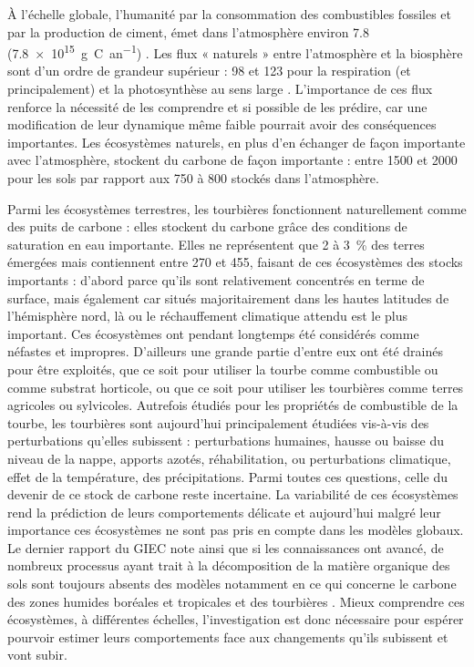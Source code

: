 À l'échelle globale, l'humanité par la consommation des combustibles fossiles et par la production de ciment, émet dans l'atmosphère environ \SI{7.8}{\pgca} (\SI{7.8e15}{\gram C an^{-1}}) \citep{Ciais2014}.
Les flux « naturels » entre l'atmosphère et la biosphère sont d'un ordre de grandeur supérieur : \num{98} et \SI{123}{\pgca} pour la respiration (\coo et \chh principalement) et la photosynthèse au sens large \citep{Bond-Lamberty2010,Beer2010}. L'importance de ces flux renforce la nécessité de les comprendre et si possible de les prédire, car une modification de leur dynamique même faible pourrait avoir des conséquences importantes.
Les écosystèmes naturels, en plus d'en échanger de façon importante avec l'atmosphère, stockent du carbone de façon importante : entre \num{1500} et \SI{2000}{\pgc} pour les sols par rapport aux \num{750} à \SI{800}{\pgc} stockés dans l'atmosphère.

Parmi les écosystèmes terrestres, les tourbières fonctionnent naturellement comme des puits de carbone : elles stockent du carbone grâce des conditions de saturation en eau importante.
Elles ne représentent que \num{2} à \SI{3}{\percent} des terres émergées mais contiennent entre \num{270} et \SI{455}{\pgc}, faisant de ces écosystèmes des stocks importants \citep{gorham1991,turunen2002} :
d'abord parce qu'ils sont relativement concentrés en terme de surface, mais également car situés majoritairement dans les hautes latitudes de l'hémisphère nord, là ou le réchauffement climatique attendu est le plus important.
Ces écosystèmes ont pendant longtemps été considérés comme néfastes et impropres.
D'ailleurs une grande partie d'entre eux ont été drainés pour être exploités, que ce soit pour utiliser la tourbe comme combustible ou comme substrat horticole, ou que ce soit pour utiliser les tourbières comme terres agricoles ou sylvicoles.
Autrefois étudiés pour les propriétés de combustible de la tourbe, les tourbières sont aujourd'hui principalement étudiées vis-à-vis des perturbations qu'elles subissent : perturbations humaines, hausse ou baisse du niveau de la nappe, apports azotés, réhabilitation, ou perturbations climatique, effet de la température, des précipitations.
Parmi toutes ces questions, celle du devenir de ce stock de carbone reste incertaine.
La variabilité de ces écosystèmes rend la prédiction de leurs comportements délicate et aujourd'hui malgré leur importance ces écosystèmes ne sont pas pris en compte dans les modèles globaux.
Le dernier rapport du GIEC note ainsi que si les connaissances ont avancé, de nombreux processus ayant trait à la décomposition de la matière organique des sols sont toujours absents des modèles notamment en ce qui concerne le carbone des zones humides boréales et tropicales et des tourbières \citep{Ciais2014}.
Mieux comprendre ces écosystèmes, à différentes échelles, l'investigation est donc nécessaire pour espérer pourvoir estimer leurs comportements face aux changements qu'ils subissent et vont subir.

